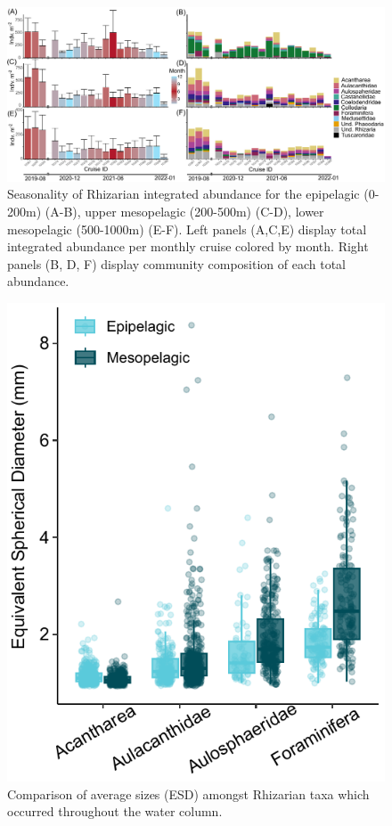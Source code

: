 \documentclass[
]{article}
\begin{document}
\begin{figure}

{\centering \includegraphics{images/05_seasonality.pdf}

}

\caption{Seasonality of Rhizarian integrated abundance for the
epipelagic (0-200m) (A-B), upper mesopelagic (200-500m) (C-D), lower
mesopelagic (500-1000m) (E-F). Left panels (A,C,E) display total
integrated abundance per monthly cruise colored by month. Right panels
(B, D, F) display community composition of each total abundance.}

\end{figure}

\newpage

\begin{figure}

{\centering \includegraphics{images/09_size-comp.pdf}

}

\caption{Comparison of average sizes (ESD) amongst Rhizarian taxa which
occurred throughout the water column.}

\end{figure}
\end{document}
